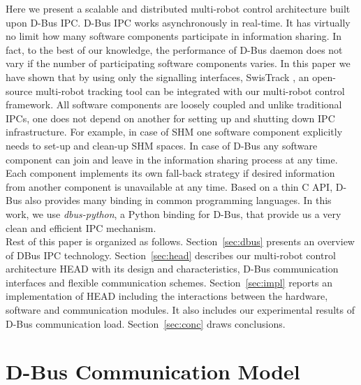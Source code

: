 \documentclass{ifacconf}
\begin{document}
Here we present a scalable and distributed multi-robot control architecture built upon D-Bus IPC. D-Bus IPC works asynchronously in real-time. It has virtually no limit how many software components participate in information sharing. In fact, to the best of our knowledge, the performance of D-Bus daemon does not vary if the number of participating software components varies. In this paper we have shown that by using only the signalling interfaces, SwisTrack \cite{xx}, an open-source multi-robot tracking tool can be integrated with our multi-robot control framework. All software components are loosely coupled and unlike traditional IPCs, one does not depend on another for setting up and shutting down IPC infrastructure. For example, in case of SHM one software component explicitly needs to set-up and clean-up SHM spaces. In case of D-Bus any software component can join and leave in the information sharing process at any time. Each component implements its own fall-back strategy if desired information from another component is unavailable at any time. Based on a thin C API, D-Bus also provides many binding in common programming languages. In this work, we use {\em dbus-python}, a Python binding for D-Bus, that provide us a very clean and efficient IPC mechanism.\\
Rest of this paper is organized as follows. Section~\ref{sec:dbus} presents an overview of DBus IPC technology.  Section~\ref{sec:head} describes our multi-robot control architecture HEAD with its design and characteristics, D-Bus communication interfaces and flexible communication schemes.  Section~\ref{sec:impl} reports an implementation of HEAD including the interactions between the hardware, software and communication modules. It also includes  our experimental results of D-Bus communication load. Section~\ref{sec:conc} draws conclusions.
\section{D-Bus Communication Model}
\end{document}
